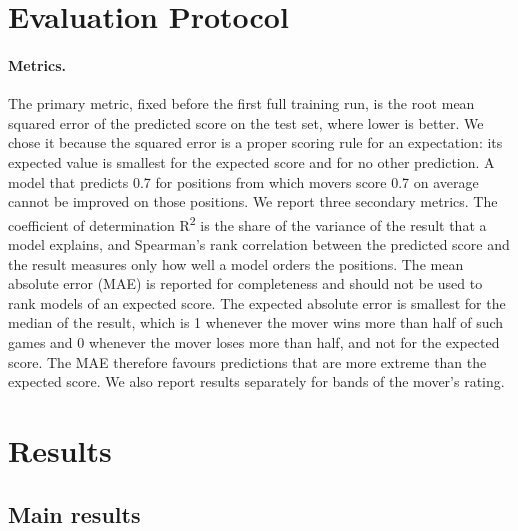 \documentclass[11pt]{article}
\begin{document}
\section{Evaluation Protocol}
\label{sec:protocol}

\paragraph{Metrics.}
The primary metric, fixed before the first full training run, is the root
mean squared error of the predicted score on the test set, where lower is
better. We chose it because the squared error is a proper scoring rule for an
expectation: its expected value is smallest for the expected score and for no
other prediction. A model that predicts 0.7 for positions from which movers
score 0.7 on average cannot be improved on those positions. We report three
secondary metrics. The coefficient of determination R\textsuperscript{2} is
the share of the variance of the result that a model explains, and
Spearman's rank correlation between the predicted score and the result
measures only how well a model orders the positions. The mean absolute error
(MAE) is reported for completeness and should not be used to rank models of
an expected score. The expected absolute error is smallest for the median of
the result, which is 1 whenever the mover wins more than half of such games
and 0 whenever the mover loses more than half, and not for the expected
score. The MAE therefore favours predictions that are more extreme than the
expected score. We also report results separately for  bands
of the mover's rating.



\section{Results}
\label{sec:results}

\subsection{Main results}
\end{document}
